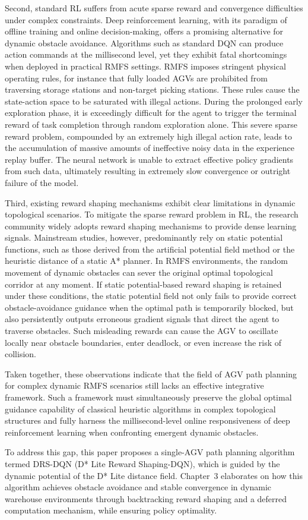 Second, standard RL suffers from acute sparse reward and convergence difficulties under complex constraints. Deep reinforcement learning, with its paradigm of offline training and online decision-making, offers a promising alternative for dynamic obstacle avoidance. Algorithms such as standard DQN can produce action commands at the millisecond level, yet they exhibit fatal shortcomings when deployed in practical RMFS settings. RMFS imposes stringent physical operating rules, for instance that fully loaded AGVs are prohibited from traversing storage stations and non-target picking stations. These rules cause the state-action space to be saturated with illegal actions. During the prolonged early exploration phase, it is exceedingly difficult for the agent to trigger the terminal reward of task completion through random exploration alone. This severe sparse reward problem, compounded by an extremely high illegal action rate, leads to the accumulation of massive amounts of ineffective noisy data in the experience replay buffer. The neural network is unable to extract effective policy gradients from such data, ultimately resulting in extremely slow convergence or outright failure of the model.

Third, existing reward shaping mechanisms exhibit clear limitations in dynamic topological scenarios. To mitigate the sparse reward problem in RL, the research community widely adopts reward shaping mechanisms to provide dense learning signals. Mainstream studies, however, predominantly rely on static potential functions, such as those derived from the artificial potential field method or the heuristic distance of a static A* planner. In RMFS environments, the random movement of dynamic obstacles can sever the original optimal topological corridor at any moment. If static potential-based reward shaping is retained under these conditions, the static potential field not only fails to provide correct obstacle-avoidance guidance when the optimal path is temporarily blocked, but also persistently outputs erroneous gradient signals that direct the agent to traverse obstacles. Such misleading rewards can cause the AGV to oscillate locally near obstacle boundaries, enter deadlock, or even increase the risk of collision.

Taken together, these observations indicate that the field of AGV path planning for complex dynamic RMFS scenarios still lacks an effective integrative framework. Such a framework must simultaneously preserve the global optimal guidance capability of classical heuristic algorithms in complex topological structures and fully harness the millisecond-level online responsiveness of deep reinforcement learning when confronting emergent dynamic obstacles.

To address this gap, this paper proposes a single-AGV path planning algorithm termed DRS-DQN (D* Lite Reward Shaping-DQN), which is guided by the dynamic potential of the D* Lite distance field. Chapter~3 elaborates on how this algorithm achieves obstacle avoidance and stable convergence in dynamic warehouse environments through backtracking reward shaping and a deferred computation mechanism, while ensuring policy optimality.
